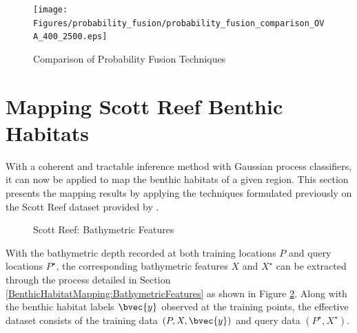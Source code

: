 				\begin{figure}[!htbp]
				\centering
					\texttt{[image: Figures/probability\_fusion/probability\_fusion\_comparison\_OVA\_400\_2500.eps]}
				\caption{Comparison of Probability Fusion Techniques}
				\label{Figure:ProbabilityFusion}
				\end{figure}
				
	\section{Mapping Scott Reef Benthic Habitats}
	\label{BenthicHabitatMapping:ScottReef}
		
		With a coherent and tractable inference method with Gaussian process classifiers, it can now be applied to map the benthic habitats of a given region. This section presents the mapping results by applying the techniques formulated previously on the Scott Reef dataset provided by \cite{IMOS}.  
			
			\begin{figure}[!htbp]
			\centering
			\caption{Scott Reef: Bathymetric Features}
			\label{Figure:ScottReefBathymetricFeatures}
			\end{figure}
			
		With the bathymetric depth recorded at both training locations $P$ and query locations $P^{\star}$, the corresponding bathymetric features $X$ and $X^{\star}$ can be extracted through the process detailed in Section \ref{BenthicHabitatMapping:BathymetricFeatures} as shown in Figure \ref{Figure:ScottReefBathymetricFeatures}. Along with the benthic habitat labels $\bvec{y}$ observed at the training points, the effective dataset consists of the training data $(P, X, \bvec{y})$ and query data $(P^{\star}, X^{\star})$.

